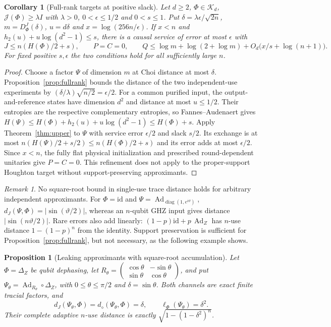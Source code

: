 \documentclass[11pt,a4paper]{article}
\theoremstyle{plain}
\newtheorem{proposition}[theorem]{Proposition}
\newtheorem{corollary}[theorem]{Corollary}
\theoremstyle{definition}
\theoremstyle{remark}
\newtheorem{remark}[theorem]{Remark}
\DeclareMathOperator{\diag}{diag}
\DeclareMathOperator{\Ad}{Ad}
\newcommand{\DChoi}{D^{J}}
\newcommand{\dJ}{d_J}
\newcommand{\ddia}{d_\diamond}
\begin{document}
\begin{corollary}[Full-rank targets at positive slack]\label{cor:fullrank-service}
Let $d\ge2$, $\Phi\in\mathcal K_d$, $\mathcal J(\Phi)\ge\lambda I$ with $\lambda>0$, $0<\epsilon\le1/2$ and $0<s\le1$.
Put $\delta=\lambda\epsilon/\sqrt{2n}$, $m=\DChoi_\Phi(\delta)$, $u=d\delta$ and $x=\log(256n/\epsilon)$.
If $x<n$ and $h_2(u)+u\log(d^2-1)\le s$, there is a causal service of error at most $\epsilon$ with
\[
J\le n(H(\Phi)/2+s),\qquad P=C=0,\qquad
Q\le\log m+\log(2+\log m)+O_d\big(x/s+\log(n+1)\big).
\]
For fixed positive $s,\epsilon$ the two conditions hold for all sufficiently large $n$.
\end{corollary}

\begin{proof}
Choose a factor $\Psi$ of dimension $m$ at Choi distance at most $\delta$. Proposition~\ref{prop:fullrank} bounds the distance of the two
independent-use experiments by $(\delta/\lambda)\sqrt{n/2}=\epsilon/2$.
For a common purified input, the output-and-reference states have dimension $d^2$ and distance at most $u\le1/2$.
Their entropies are the respective complementary entropies, so Fannes--Audenaert gives
$H(\Psi)\le H(\Phi)+h_2(u)+u\log(d^2-1)\le H(\Phi)+s$.
Apply Theorem~\ref{thm:upper} to $\Psi$ with service error $\epsilon/2$ and slack $s/2$. Its exchange is at most
$n(H(\Psi)/2+s/2)\le n(H(\Phi)/2+s)$ and its error adds at most $\epsilon/2$.
Since $x<n$, the fully flat physical initialization and prescribed round-dependent unitaries give $P=C=0$.
This refinement does not apply to the proper-support Houghton target without support-preserving approximants.
\end{proof}

\begin{remark}
No square-root bound in single-use trace distance holds for arbitrary independent approximants. For $\Phi=\mathrm{id}$ and
$\Psi=\Ad_{\diag(1,e^{i\vartheta})}$, $\dJ(\Psi,\Phi)=|\sin(\vartheta/2)|$, whereas an $n$-qubit GHZ input gives distance
$|\sin(n\vartheta/2)|$. Rare errors also add linearly: $(1-p)\mathrm{id}+p\,\Ad_Z$ has $n$-use distance $1-(1-p)^n$ from the identity.
Support preservation is sufficient for Proposition~\ref{prop:fullrank}, but not necessary, as the following example shows.
\end{remark}

\begin{proposition}[Leaking approximants with square-root accumulation]\label{prop:leaking-sqrt}
Let $\Phi=\Delta_Z$ be qubit dephasing, let
$R_\theta=\left(\begin{smallmatrix}\cos\theta&-\sin\theta\\\sin\theta&\cos\theta\end{smallmatrix}\right)$,
and put $\Psi_\theta=\Ad_{R_\theta}\circ\Delta_Z$, with $0\le\theta\le\pi/2$ and $\delta=\sin\theta$.
Both channels are exact finite tracial factors, and
\[
\dJ(\Psi_\theta,\Phi)=\ddia(\Psi_\theta,\Phi)=\delta,\qquad
\ell_\Phi(\Psi_\theta)=\delta^2.
\]
Their complete adaptive $n$-use distance is exactly $\sqrt{1-(1-\delta^2)^n}$.
\end{proposition}
\end{document}

